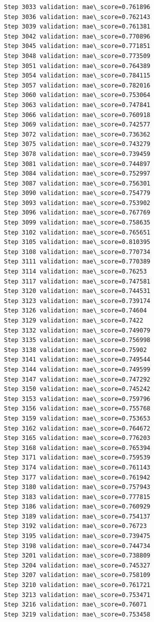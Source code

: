 \documentclass[11pt]{article}
\begin{document}
\begin{Verbatim}[commandchars=\\\{\}]
Step 3033 validation: mae\_score=0.761896
Step 3036 validation: mae\_score=0.762143
Step 3039 validation: mae\_score=0.761381
Step 3042 validation: mae\_score=0.770896
Step 3045 validation: mae\_score=0.771851
Step 3048 validation: mae\_score=0.773509
Step 3051 validation: mae\_score=0.764389
Step 3054 validation: mae\_score=0.784115
Step 3057 validation: mae\_score=0.782016
Step 3060 validation: mae\_score=0.753064
Step 3063 validation: mae\_score=0.747841
Step 3066 validation: mae\_score=0.760918
Step 3069 validation: mae\_score=0.742577
Step 3072 validation: mae\_score=0.736362
Step 3075 validation: mae\_score=0.743279
Step 3078 validation: mae\_score=0.739459
Step 3081 validation: mae\_score=0.744897
Step 3084 validation: mae\_score=0.752997
Step 3087 validation: mae\_score=0.756301
Step 3090 validation: mae\_score=0.754779
Step 3093 validation: mae\_score=0.753902
Step 3096 validation: mae\_score=0.767769
Step 3099 validation: mae\_score=0.758635
Step 3102 validation: mae\_score=0.765651
Step 3105 validation: mae\_score=0.810395
Step 3108 validation: mae\_score=0.770734
Step 3111 validation: mae\_score=0.770389
Step 3114 validation: mae\_score=0.76253
Step 3117 validation: mae\_score=0.747581
Step 3120 validation: mae\_score=0.744531
Step 3123 validation: mae\_score=0.739174
Step 3126 validation: mae\_score=0.74604
Step 3129 validation: mae\_score=0.7422
Step 3132 validation: mae\_score=0.749079
Step 3135 validation: mae\_score=0.756998
Step 3138 validation: mae\_score=0.75902
Step 3141 validation: mae\_score=0.749544
Step 3144 validation: mae\_score=0.749599
Step 3147 validation: mae\_score=0.747292
Step 3150 validation: mae\_score=0.745242
Step 3153 validation: mae\_score=0.759796
Step 3156 validation: mae\_score=0.755768
Step 3159 validation: mae\_score=0.753653
Step 3162 validation: mae\_score=0.764672
Step 3165 validation: mae\_score=0.776203
Step 3168 validation: mae\_score=0.765394
Step 3171 validation: mae\_score=0.759539
Step 3174 validation: mae\_score=0.761143
Step 3177 validation: mae\_score=0.761942
Step 3180 validation: mae\_score=0.757943
Step 3183 validation: mae\_score=0.777815
Step 3186 validation: mae\_score=0.760929
Step 3189 validation: mae\_score=0.754137
Step 3192 validation: mae\_score=0.76723
Step 3195 validation: mae\_score=0.739475
Step 3198 validation: mae\_score=0.744734
Step 3201 validation: mae\_score=0.738809
Step 3204 validation: mae\_score=0.745327
Step 3207 validation: mae\_score=0.758109
Step 3210 validation: mae\_score=0.761721
Step 3213 validation: mae\_score=0.753471
Step 3216 validation: mae\_score=0.76071
Step 3219 validation: mae\_score=0.753458

\end{Verbatim}
\end{document}
